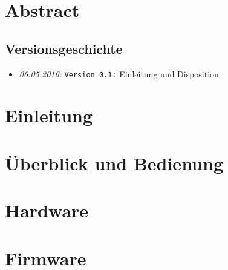 \documentclass{fhnwreport/fhnwreport}
\begin{document}


\clearpage
\pagestyle{empty}
{
    \section*{Abstract}
    \label{sec:abstract}
    
}

\clearpage
\tableofcontents
\vspace{10mm}
\subsection*{Versionsgeschichte}
\begin{itemize}
    \item[]
        \emph{06.05.2016:} \texttt{Version 0.1:} Einleitung und Disposition
\end{itemize}
\clearpage


\clearpage
\section{Einleitung}
\label{sec:einleitung}



\clearpage
\section{\"Uberblick und Bedienung}
\label{sec:uberblick}



\clearpage
\section{Hardware}
\label{sec:hardware}



\clearpage
\section{Firmware}
\label{sec:firmware}

\end{document}
